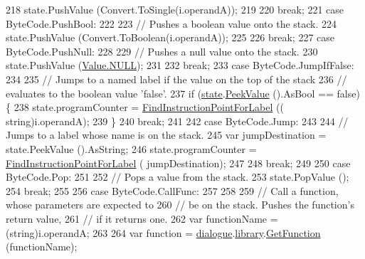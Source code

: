 \begin{DoxyCode}
218                 state.PushValue (Convert.ToSingle(i.operandA));
219 
220                 \textcolor{keywordflow}{break};
221             \textcolor{keywordflow}{case} ByteCode.PushBool:
222 
223                 \textcolor{comment}{// Pushes a boolean value onto the stack.}
224                 state.PushValue (Convert.ToBoolean(i.operandA));
225 
226                 \textcolor{keywordflow}{break};
227             \textcolor{keywordflow}{case} ByteCode.PushNull:
228 
229                 \textcolor{comment}{// Pushes a null value onto the stack.}
230                 state.PushValue (\hyperlink{a00161_a1ed2964965baca8621c45efa23f37660}{Value.NULL});
231 
232                 \textcolor{keywordflow}{break};
233             \textcolor{keywordflow}{case} ByteCode.JumpIfFalse:
234 
235                 \textcolor{comment}{// Jumps to a named label if the value on the top of the stack}
236                 \textcolor{comment}{// evaluates to the boolean value 'false'.}
237                 \textcolor{keywordflow}{if} (\hyperlink{a00136_a70f2ce6201cdd2430ceaa764ac614ca0}{state}.\hyperlink{a00139_a54fd5b64ec94e937e771846167242dc2}{PeekValue} ().AsBool == \textcolor{keyword}{false}) \{
238                     state.programCounter = \hyperlink{a00136_af613c8b2d098678b6ea05b509c0a0cb6}{FindInstructionPointForLabel} ((\textcolor{keywordtype}{
      string})i.operandA);
239                 \}
240                 \textcolor{keywordflow}{break};
241 
242             \textcolor{keywordflow}{case} ByteCode.Jump:
243 
244                 \textcolor{comment}{// Jumps to a label whose name is on the stack.}
245                 var jumpDestination = state.PeekValue ().AsString;
246                 state.programCounter = \hyperlink{a00136_af613c8b2d098678b6ea05b509c0a0cb6}{FindInstructionPointForLabel} (
      jumpDestination);
247 
248                 \textcolor{keywordflow}{break};
249 
250             \textcolor{keywordflow}{case} ByteCode.Pop:
251 
252                 \textcolor{comment}{// Pops a value from the stack.}
253                 state.PopValue ();
254                 \textcolor{keywordflow}{break};
255 
256             \textcolor{keywordflow}{case} ByteCode.CallFunc:
257 
258 
259                 \textcolor{comment}{// Call a function, whose parameters are expected to}
260                 \textcolor{comment}{// be on the stack. Pushes the function's return value,}
261                 \textcolor{comment}{// if it returns one.}
262                 var functionName = (string)i.operandA;
263 
264                 var \textcolor{keyword}{function} = \hyperlink{a00136_ac506426c503da5f033247c29e11c5e82}{dialogue}.\hyperlink{a00070_ae660d4cfb6e296358d2f61d8ee74c66a}{library}.\hyperlink{a00101_aacfb1f00ad8aa3921941b8d8af0960e0}{GetFunction} (functionName);

\end{DoxyCode}
